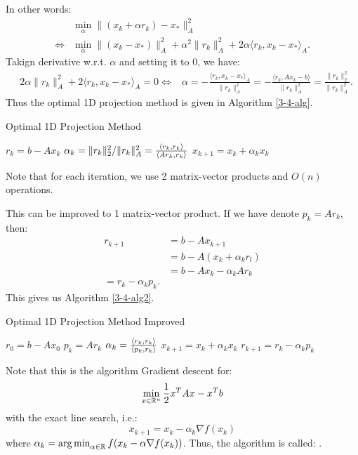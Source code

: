 \documentclass[../main/main.tex]{subfiles}
\begin{document}
In other words:
\begin{align*}
 & \min _{\alpha } \|(x_{k}+\alpha r_{k})-x_{*}\|_{A}^2\\
 \iff & \min _{\alpha }\|(x_{k}-x_{*})\|^2_{A}+ \alpha ^2 \|r_{k}\|_{A}^2 + 2\alpha \langle r_{k}, x_{k}-x_{*}\rangle_{A}
  .\end{align*}
Takign derivative w.r.t. $\alpha $ and setting it to 0, we have:
\begin{align*}
&  2\alpha \|r_{k}\|_{A}^2 + 2\langle r_{k}, x_{k}-x_{*}\rangle_{A}=0
                 \iff & \alpha = - \frac{\langle r_{k}, x_{k}- x_{*}\rangle_{A}}{\|r_{k}\|_{A}^2} =  - \frac{\langle r_{k}, Ax_{k}- b\rangle}{\|r_{k}\|_{A}^2}  = \frac{\|r_{k}\|_{2}^2}{\|r_{k}\|_{A}^2}
  .\end{align*}
Thus the optimal 1D projection method is given in Algorithm \ref{3-4-alg}.
        \begin{algorithm}[h!]
	\caption{Optimal 1D Projection Method}
    \label{3-4-alg}
	\begin{algorithmic}[1]
 \State $r_{k}=b-Ax_{k}$
 \State $\alpha _{k} = \|r_{k}\|^2_{2} / \|r_{k}\|_{A}^2 = \frac{\left\langle{r_{k}},{r_{k}}\right\rangle}{\left\langle{Ar_{k}},{r_{k}}\right\rangle} $
 \State $x_{k+1} = x_{k}+\alpha _{k}x_{k}$
      \EndFor
	\end{algorithmic}
	\end{algorithm}
  \begin{remark}
Note that for each iteration, we use 2 matrix-vector products and $O(n)$ operations.
  \end{remark}
  This can be improved to 1 matrix-vector product. If we have denote $p_{k} = Ar_{k}$, then:
  \begin{align*}
    r_{k+1} &= b - Ax_{k+1} \\
            &= b-A(x_{k}+\alpha_{k}r_{l}) \\
            &= b-Ax_{k}-\alpha _{k}Ar_{k}\\
    = r_{k} - \alpha _{k} p_{k}
    .\end{align*}
  This gives us Algorithm \ref{3-4-alg2}.
        \begin{algorithm}[h!]
	\caption{Optimal 1D Projection Method Improved}
    \label{3-4-alg}
	\begin{algorithmic}[1]
      \State $r_{0}=b-Ax_{0}$
      \State $p_{k} = Ar_{k}$
 \State $\alpha _{k} = \frac{\left\langle{r_{k}},{r_{k}}\right\rangle}{\left\langle{p_{k}},{r_{k}}\right\rangle} $
 \State $x_{k+1} = x_{k}+\alpha _{k}x_{k}$
 \State $r_{k+1} = r_{k}- \alpha _{k}p_{k}$
      \EndFor
	\end{algorithmic}
	\end{algorithm}
    Note that this is the algorithm Gradient descent for: \[
\min_{x\in \mathbb{R} ^{n}} \frac{1}{2} x^{T}Ax-x^{T}b
\] with the exact line search, i.e.: \[
x_{k+1} = x_{k} -\alpha _{k}\nabla f(x_{k})
\] where $\alpha _{k} = \operatorname*{arg\,min}_{\alpha  \in \mathbb{R} } f(x_{k}-\alpha \nabla f(x_{k}))$. Thus, the algorithm is called: .
\end{document}
